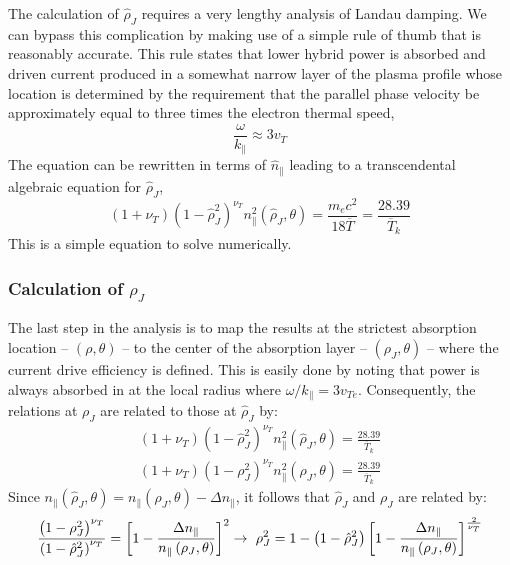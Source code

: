 The calculation of $\hat \rho_J$ requires a very lengthy analysis of Landau damping. We can bypass this complication by making use of a simple rule of thumb that is reasonably accurate. This rule states that lower hybrid power is absorbed and driven current produced in a somewhat narrow layer of the plasma profile whose location is determined by the requirement that the parallel phase velocity be approximately equal to three times the electron thermal speed,
\begin{equation}
	\frac { \omega } { k _ { \| } } \approx 3 v _ { T }
\end{equation}
The equation can be rewritten in terms of $\hat n_\parallel$ leading to a transcendental algebraic equation for $\hat \rho_J$,
\begin{equation}
	\left( 1 + \nu _ { T } \right) \left( 1 - \hat { \rho } _ { J } ^ { 2 } \right) ^ { \nu _ { T } } n _ { \| } ^ { 2 } \left( \hat { \rho } _ { J } , \theta \right) = \frac { m _ { e } c ^ { 2 } } { 18 \overline { T } } = \frac { 28.39 } { \overline { T } _ { k } }
\end{equation}
This is a simple equation to solve numerically.

\subsubsection{Calculation of $\rho_J$}
The last step in the analysis is to map the results at the strictest absorption location -- $(\rho, \theta)$ -- to the center of the absorption layer -- $(\rho_J, \theta)$ -- where the current drive efficiency is defined. This is easily done by noting that power is always absorbed in at the local radius where $\omega / k _ { \| } = 3 v _ { T e }$. Consequently, the relations at $\rho_J$ are related to those at $\hat \rho_J$ by:
\begin{gather}
	\left( 1 + \nu _ { T } \right) \left( 1 - \hat { \rho } _ { J } ^ { 2 } \right) ^ { \nu _ { T } } n _ { \| } ^ { 2 } \left( \hat { \rho } _ { J } , \theta \right) = \frac { 28.39 } { \overline { T } _ { k } } \\
	\left( 1 + \nu _ { T } \right) \left( 1 - \rho _ { J } ^ { 2 } \right) ^ { \nu _ { T } } n _ { \| } ^ { 2 } \left( \rho _ { J } , \theta \right) = \frac { 28.39 } { \overline { T } _ { k } } 
\end{gather}
Since $n _ { \| } \left( \hat { \rho } _ { J } , \theta \right) = n _ { \| } \left( \rho _ { J } , \theta \right) - \Delta n _ { \| }$, it follows that $\hat \rho_J$ and $\rho_J$ are related by:
\begin{equation}
	\small
	\frac { \left( 1 - \rho _ { J } ^ { 2 } \right) ^ { \nu _ { T } } } { \left( 1 - \hat { \rho } _ { J } ^ { 2 } \right) ^ { \nu _ { T } } } = \left[ 1 - \frac { \Delta n _ { \| } } { n _ { \| } \left( \rho _ { J } , \theta \right) } \right] ^ { 2 } \rightarrow \ \rho _ { J } ^ { 2 } = 1 - \left( 1 - \hat { \rho } _ { J } ^ { 2 } \right) \left[ 1 - \frac { \Delta n _ { \| } } { n _ { \| } \left( \rho _ { J } , \theta \right) } \right] ^ { \frac{2}{\nu _ { T }} }
\end{equation}

